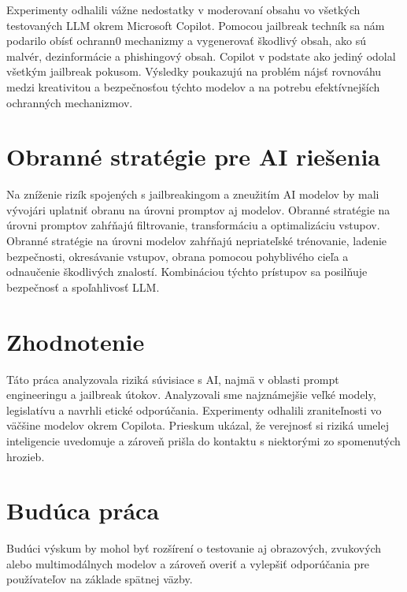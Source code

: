 Experimenty odhalili vážne nedostatky v moderovaní obsahu vo všetkých testovaných LLM okrem Microsoft Copilot. Pomocou jailbreak techník sa nám podarilo obísť ochrann0 mechanizmy a vygenerovať škodlivý obsah, ako sú malvér, dezinformácie a phishingový obsah. Copilot v podstate ako jediný odolal všetkým jailbreak pokusom. Výsledky poukazujú na problém nájsť rovnováhu medzi kreativitou a bezpečnosťou týchto modelov a na potrebu efektívnejších ochranných mechanizmov.

\section*{Obranné stratégie pre AI riešenia \label{sec:mitigation_strategies_resume}}

Na zníženie rizík spojených s jailbreakingom a zneužitím AI modelov by mali vývojári uplatniť obranu na úrovni promptov aj modelov. Obranné stratégie na úrovni promptov zahŕňajú filtrovanie, transformáciu a optimalizáciu vstupov. Obranné stratégie na úrovni modelov zahŕňajú nepriateľské trénovanie, ladenie bezpečnosti, okresávanie vstupov, obrana pomocou pohyblivého cieľa a odnaučenie škodlivých znalostí. Kombináciou týchto prístupov sa posilňuje bezpečnosť a spoľahlivosť LLM.

\section*{Zhodnotenie \label{sec:conclusion_summary_resume}}

Táto práca analyzovala riziká súvisiace s AI, najmä v oblasti prompt engineeringu a jailbreak útokov. Analyzovali sme najznámejšie veľké modely, legislatívu a navrhli etické odporúčania. Experimenty odhalili zraniteľnosti vo väčšine modelov okrem Copilota. Prieskum ukázal, že verejnosť si riziká umelej inteligencie uvedomuje a zároveň prišla do kontaktu s niektorými zo spomenutých hrozieb.

\section*{Budúca práca \label{sec:future_work_resume}}

Budúci výskum by mohol byť rozšírení o testovanie aj obrazových, zvukových alebo multimodálnych modelov a zároveň overiť a vylepšiť odporúčania pre používateľov na základe spätnej väzby.